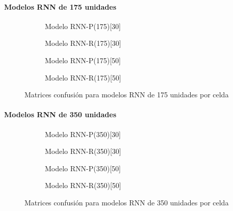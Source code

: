 \paragraph{Modelos RNN de 175 unidades}
\begin{figure}[H]
  \centering
  \begin{subfigure}[t]{0.48\textwidth}
      \centering
      \caption{\footnotesize \label{fig:app:confmatrix:P17530}Modelo RNN-P(175)[30]}
  \end{subfigure}
  \hfill
  \begin{subfigure}[t]{0.48\textwidth}
      \centering
      \caption{\footnotesize \label{fig:app:confmatrix:R17530}Modelo RNN-R(175)[30]}
  \end{subfigure}
  \begin{subfigure}[t]{0.48\textwidth}
      \centering
      \caption{\footnotesize \label{fig:app:confmatrix:P17550}Modelo RNN-P(175)[50]}
  \end{subfigure}
  \hfill
  \begin{subfigure}[t]{0.48\textwidth}
      \centering
      \caption{\footnotesize \label{fig:app:confmatrix:R17550}Modelo RNN-R(175)[50]}
  \end{subfigure}
  \caption{\label{fig:app:confmatrix:175} Matrices confusión para modelos RNN de 175 unidades por celda}
\end{figure}

\paragraph{Modelos RNN de 350 unidades}

\begin{figure}[H]
  \centering
  \begin{subfigure}[t]{0.48\textwidth}
      \centering
      \caption{\footnotesize \label{fig:app:confmatrix:P35030}Modelo RNN-P(350)[30]}
  \end{subfigure}
  \hfill
  \begin{subfigure}[t]{0.48\textwidth}
      \centering
      \caption{\footnotesize \label{fig:app:confmatrix:R35030}Modelo RNN-R(350)[30]}
  \end{subfigure}
  \begin{subfigure}[t]{0.48\textwidth}
      \centering
      \caption{\footnotesize \label{fig:app:confmatrix:P35050}Modelo RNN-P(350)[50]}
  \end{subfigure}
  \hfill
  \begin{subfigure}[t]{0.48\textwidth}
      \centering
      \caption{\footnotesize \label{fig:app:confmatrix:R35050}Modelo RNN-R(350)[50]}
  \end{subfigure}
  \caption{\label{fig:app:confmatrix:350} Matrices confusión para modelos RNN de 350 unidades por celda}
\end{figure}

